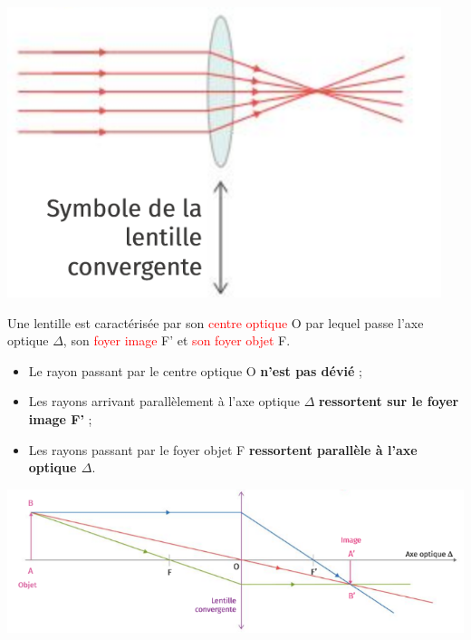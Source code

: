 \begin{tcolorbox}[colback=green!5!white,colframe=green!75!black,title=\textbf{Lentille convergente :}]
\begin{multicols}{2}
    \includegraphics[scale=0.7]{Images/Cours/Chapitre_4/Lentille.PNG}
    
    Une lentille est caractérisée par son \textcolor{red}{centre optique} O par lequel passe l'axe optique $\Delta$, son \textcolor{red}{foyer image} F' et \textcolor{red}{son foyer objet} F.
\end{multicols}
\end{tcolorbox}


\begin{tcolorbox}[colback=red!5!white,colframe=red!75!black,title=\textbf{Construction d'une image par une lentille :}]
\begin{itemize}
    \item Le rayon passant par le centre optique O \textbf{n'est pas dévié} ;
    \item Les rayons arrivant parallèlement à l'axe optique $\Delta$ \textbf{ressortent sur le foyer image F'} ;
    \item Les rayons passant par le foyer objet F \textbf{ressortent parallèle à l'axe optique $\Delta$}.
\end{itemize}
\end{tcolorbox}

\begin{center}
\includegraphics[scale=1]{Images/Cours/Chapitre_4/Lentille_construction.png}
\end{center}

